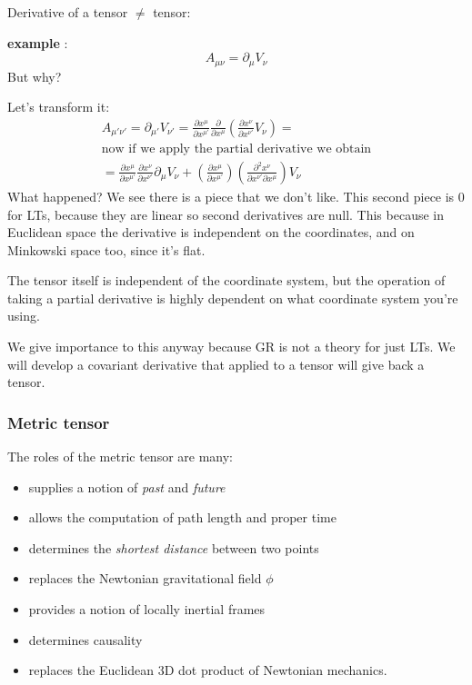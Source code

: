 Derivative of a tensor $\neq$ tensor:\par
\textbf{example} : 
\[
A_{\mu \nu } = \partial_{\mu }V_{\nu }
\]
But why? \par
Let's transform it:
\begin{gather*}
A_{\mu '\nu '} = \partial_{\mu '}V_{\nu '} = \frac{\partial x^{\mu }}{\partial x^{\mu '}} \frac{\partial }{\partial x^{\mu }} \left( \frac{\partial x^{\nu }}{\partial x^{\nu '}}V_{\nu }  \right) = \\
\text{now if we apply the partial derivative we obtain}\\
= \frac{\partial x^{\mu }}{\partial x^{\mu '}} \frac{\partial x^{\nu }}{\partial x^{\nu '}} \partial_{\mu } V_{\nu } + \left( \frac{\partial x^{\mu }}{\partial x^{\mu '}}  \right)\left( \frac{\partial^{2}x^{\nu }}{\partial x^{\nu '}\partial x^{\mu }}  \right)V_{\nu }
\end{gather*}
What happened? We see there is a piece that we don't like. This second piece is 0 for LTs, because they are linear so second derivatives are null. This because in Euclidean space the derivative is independent on the coordinates, and on Minkowski space too, since it's flat. \par
The tensor itself is independent of the coordinate system, but the operation of taking a partial derivative is highly dependent on what coordinate system you're using.\par
We give importance to this anyway because GR is not a theory for just LTs.
We will develop a covariant derivative that applied to a tensor will give back a tensor.

\subsubsection{Metric tensor}
The roles of the metric tensor are many:
\begin{itemize}
	\item supplies a notion of \emph{past} and \emph{future}
	\item allows the computation of path length and proper time
	\item determines the \emph{shortest distance} between two points
	\item replaces the Newtonian gravitational field $\phi $
	\item provides a notion of locally inertial frames
	\item determines causality
	\item replaces the Euclidean 3D dot product of Newtonian mechanics.
\end{itemize}

